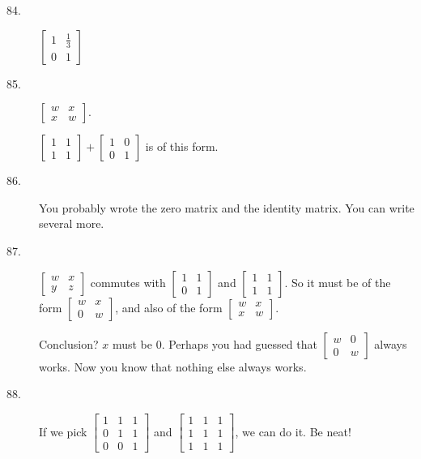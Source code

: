 \documentclass{article}
\begin{document}
\begin{description}
  \item[84.] $\begin{bmatrix} 1 & \frac{1}{3} \\ 0 & 1 \end{bmatrix}$

  \item[85.] $\begin{bmatrix} w & x \\ x & w \end{bmatrix}$.

    $\begin{bmatrix} 1 & 1 \\ 1 & 1 \end{bmatrix}  +  \begin{bmatrix} 1 & 0 \\ 0 & 1 \end{bmatrix}$ is of this form.

  \item[86.] You probably wrote the zero matrix and the identity matrix. You can write several more.

  \item[87.] $\begin{bmatrix} w & x \\ y & z \end{bmatrix}$ commutes with $\begin{bmatrix} 1 & 1 \\ 0 & 1 \end{bmatrix}$ and $\begin{bmatrix} 1 & 1 \\ 1 & 1 \end{bmatrix}$. So it must be of the form $\begin{bmatrix} w & x \\ 0 & w \end{bmatrix}$, and also of the form $\begin{bmatrix} w & x \\ x & w \end{bmatrix}$. 

    Conclusion? $x$ must be $0$. Perhaps you had guessed that $\begin{bmatrix} w & 0 \\ 0 & w \end{bmatrix}$ always works. Now you know that nothing else always works.

  \item[88.] If we pick $\begin{bmatrix} 1 & 1 & 1 \\ 0 & 1 & 1 \\ 0 & 0 & 1 \end{bmatrix}$ and $\begin{bmatrix} 1 & 1 & 1 \\ 1 & 1 & 1 \\ 1 & 1 & 1 \end{bmatrix}$, we can do it. Be neat!


\end{description}
\end{document}
